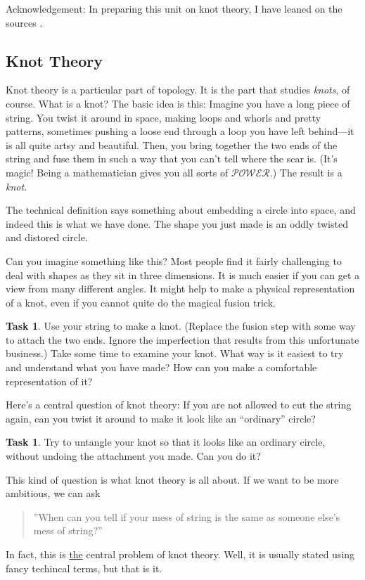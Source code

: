 \documentclass[12pt,letterpaper]{article}
\theoremstyle{definition}
\newtheorem{task}[question]{Task}
\begin{document}
Acknowledgement: In preparing this unit on knot theory, I have leaned on the sources \cite{Adams, ArtOfMath:knots, knotinfo}.

\subsection*{Knot Theory}

Knot theory is a particular part of topology. 
It is the part that studies \emph{knots}, of course.
What is a knot?
The basic idea is this:
Imagine you have a long piece of string.
You twist it around in space, making loops and whorls and pretty patterns, sometimes pushing a loose end through a loop you have left behind---it is all quite artsy and beautiful.
Then, you bring together the two ends of the string and fuse them in such a way that you can't tell where the scar is.
(It's magic!
Being a mathematician gives you all sorts of 
$\mathcal{POWER}$.)
The result is a \emph{knot}.

The technical definition says something about embedding a circle into space, and indeed this is what we have done.
The shape you just made is an oddly twisted and distored circle.

Can you imagine something like this?
Most people find it fairly challenging to deal with shapes as they sit in three dimensions.
It is much easier if you can get a view from many different angles.
It might help to make a physical representation of a knot, even if you cannot quite do the magical fusion trick.

\begin{task}
Use your string to make a knot.
(Replace the fusion step with some way to attach the two ends. 
Ignore the imperfection that results from this unfortunate business.)
Take some time to examine your knot.
What way is it easiest to try and understand what you have made?
How can you make a comfortable representation of it?
\end{task}

Here's a central question of knot theory: If you are not allowed to cut the string again, can you twist it around to make it look like an ``ordinary'' circle?

\begin{task}
Try to untangle your knot so that it looks like an ordinary circle, without undoing the attachment you made. Can you do it?
\end{task}

This kind of question is what knot theory is all about.
If we want to be more ambitious, we can ask
\begin{quote}
''When can you tell if your mess of string is the same as someone else's mess of string?''
\end{quote}
In fact, this is \underline{the} central problem of knot theory.
Well, it is usually stated using fancy techincal terms, but that is it.
\end{document}
